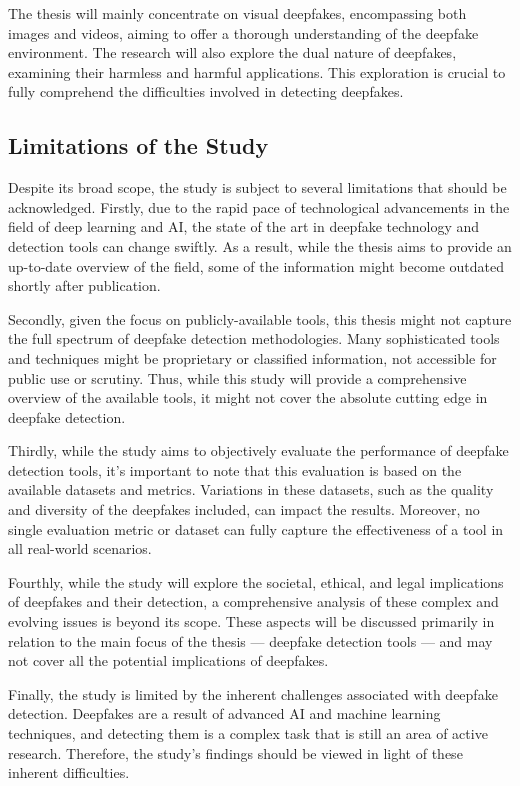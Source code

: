 The thesis will mainly concentrate on visual deepfakes, encompassing both images and 
videos, aiming to offer a thorough understanding of the deepfake environment. The 
research will also explore the dual nature of deepfakes, examining their harmless 
and harmful applications. This exploration is crucial to fully comprehend the 
difficulties involved in detecting deepfakes.

\subsection{Limitations of the Study}
Despite its broad scope, the study is subject to several limitations that should be 
acknowledged. Firstly, due to the rapid pace of technological advancements in the field 
of deep learning and \ac{AI}, the state of the art in deepfake technology and detection tools 
can change swiftly. As a result, while the thesis aims to provide an up-to-date overview 
of the field, some of the information might become outdated shortly after publication.

Secondly, given the focus on publicly-available tools, this thesis might not capture 
the full spectrum of deepfake detection methodologies. Many sophisticated tools and 
techniques might be proprietary or classified information, not accessible for public 
use or scrutiny. Thus, while this study will provide a comprehensive overview of the 
available tools, it might not cover the absolute cutting edge in deepfake detection.

Thirdly, while the study aims to objectively evaluate the performance of deepfake 
detection tools, it's important to note that this evaluation is based on the 
available datasets and metrics. Variations in these datasets, such as the quality 
and diversity of the deepfakes included, can impact the results. Moreover, no 
single evaluation metric or dataset can fully capture the effectiveness of a tool 
in all real-world scenarios.

Fourthly, while the study will explore the societal, ethical, and legal implications 
of deepfakes and their detection, a comprehensive analysis of these complex and 
evolving issues is beyond its scope. These aspects will be discussed primarily in 
relation to the main focus of the thesis --- deepfake detection tools --- and may not 
cover all the potential implications of deepfakes.

Finally, the study is limited by the inherent challenges associated with deepfake 
detection. Deepfakes are a result of advanced \ac{AI} and machine learning techniques, 
and detecting them is a complex task that is still an area of active research. 
Therefore, the study's findings should be viewed in light of these inherent difficulties.

